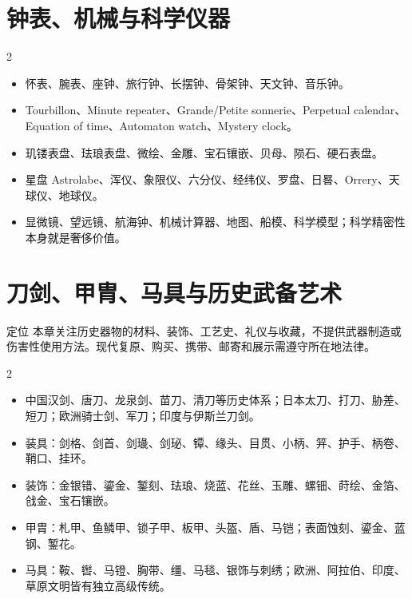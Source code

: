 \documentclass[lang=en,a4paper,11pt]{elegantpaper}
\begin{document}
\section{钟表、机械与科学仪器}


\begin{multicols}{2}
\begin{itemize}
\item 怀表、腕表、座钟、旅行钟、长摆钟、骨架钟、天文钟、音乐钟。
\item Tourbillon、Minute repeater、Grande/Petite sonnerie、Perpetual calendar、Equation of time、Automaton watch、Mystery clock。
\item 玑镂表盘、珐琅表盘、微绘、金雕、宝石镶嵌、贝母、陨石、硬石表盘。
\item 星盘 Astrolabe、浑仪、象限仪、六分仪、经纬仪、罗盘、日晷、Orrery、天球仪、地球仪。
\item 显微镜、望远镜、航海钟、机械计算器、地图、船模、科学模型；科学精密性本身就是奢侈价值。
\end{itemize}
\end{multicols}

\section{刀剑、甲胄、马具与历史武备艺术}


\begin{legalbox}{定位}
本章关注历史器物的材料、装饰、工艺史、礼仪与收藏，不提供武器制造或伤害性使用方法。现代复原、购买、携带、邮寄和展示需遵守所在地法律。
\end{legalbox}

\begin{multicols}{2}
\begin{itemize}
\item 中国汉剑、唐刀、龙泉剑、苗刀、清刀等历史体系；日本太刀、打刀、胁差、短刀；欧洲骑士剑、军刀；印度与伊斯兰刀剑。
\item 装具：剑格、剑首、剑璏、剑珌、镡、缘头、目贯、小柄、笄、护手、柄卷、鞘口、挂环。
\item 装饰：金银错、鎏金、錾刻、珐琅、烧蓝、花丝、玉雕、螺钿、莳绘、金箔、戗金、宝石镶嵌。
\item 甲胄：札甲、鱼鳞甲、锁子甲、板甲、头盔、盾、马铠；表面蚀刻、鎏金、蓝钢、錾花。
\item 马具：鞍、辔、马镫、胸带、缰、马毯、银饰与刺绣；欧洲、阿拉伯、印度、草原文明皆有独立高级传统。
\end{itemize}
\end{multicols}
\end{document}
